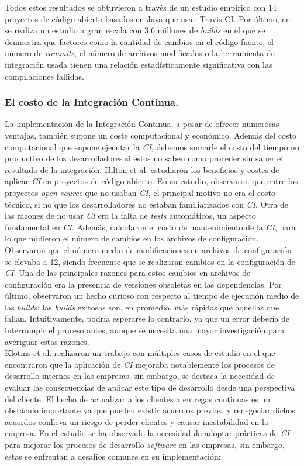 Todos estos resultados se obtuvieron a través de un estudio empírico con 14 proyectos de código
abierto basados en Java que usan Travis CI. Por último, en \cite{16} se realiza un estudio a gran
escala con 3.6 millones de \textit{builds} en el que se demuestra que factores como la cantidad
de cambios en el código fuente, el número de \textit{commits}, el número de archivos modificados
o la herramienta de integración usada tienen una relación estadísticamente significativa con las
compilaciones fallidas.\\ 

\subsubsection{El costo de la Integración Continua.}
La implementación de la Integración Continua, a pesar de ofrecer numerosas ventajas, también
supone un coste computacional y económico. Además del costo computacional que supone ejecutar
la \textit{CI}, debemos sumarle el costo del tiempo no productivo de los desarrolladores si estos
no saben como proceder sin saber el resultado de la integración. Hilton et al. \cite{10} estudiaron
los beneficios y costes de aplicar \textit{CI} en proyectos de código abierto. En su estudio,
observaron que entre los proyectos \textit{open-source} que no usaban \textit{CI}, el principal
motivo no era el costo técnico, si no que los desarrolladores no estaban familiarizados con
\textit{CI}. Otra de las razones de no usar \textit{CI} era la falta de \textit{tests} automáticos,
un aspecto fundamental en \textit{CI}. Además, calcularon el costo de mantenimiento de la
\textit{CI}, para lo que midieron el número de cambios en los archivos de configuración. Observaron
que el número medio de modificaciones en archivos de configuración se elevaba a 12, siendo
frecuente que se realizaran cambios en la configuración de \textit{CI}. Una de las principales
razones para estos cambios en archivos de configuración era la presencia de versiones obsoletas
en las dependencias. Por último, observaron un hecho curioso con respecto al tiempo de ejecución
medio de las \textit{builds}: las \textit{builds} exitosas son, en promedio, más rápidas que
aquellas que fallan. Intuitivamente, podría esperarse lo contrario, ya que un error debería de
interrumpir el proceso antes, aunque se necesita una mayor investigación para averiguar estas
razones.\\

Klotins et al. \cite{18} realizaron un trabajo con múltiples casos de estudio en el que
encontraron que la aplicación de \textit{CI} mejoraba notablemente los procesos de desarrollo
internos en las empresas, sin embargo, se destaca la necesidad de evaluar las consecuencias de
aplicar este tipo de desarrollo desde una perspectiva del cliente. El hecho de actualizar a los
clientes a entregas continuas es un obstáculo importante ya que pueden existir acuerdos previos,
y renegociar dichos acuerdos conlleva un riesgo de perder clientes y causar inestabilidad en la
empresa. En el estudio se ha observado la necesidad de adoptar prácticas de \textit{CI} para
mejorar los procesos de desarrollo \textit{software} en las empresas, sin embargo, estas se
enfrentan a desafíos comunes en su implementación:

